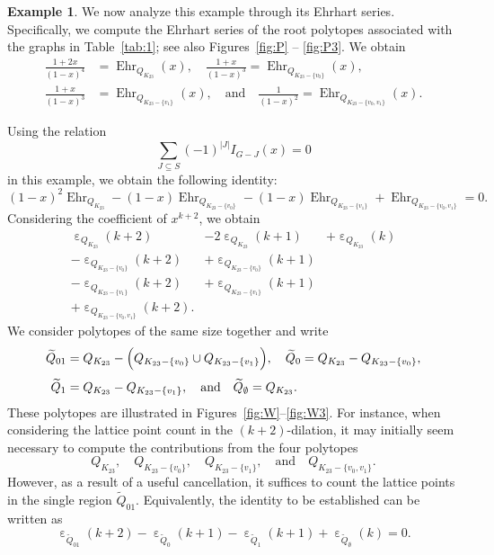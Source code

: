 \documentclass{amsart}
\theoremstyle{definition}
\newtheorem{example}[theorem]{Example}
\theoremstyle{remark}
\DeclareMathOperator{\Ehr}{Ehr}
\DeclareMathOperator{\ehr}{\varepsilon}
\numberwithin{equation}{section}
\begin{document}
\begin{example}
We now analyze this example through its Ehrhart series. Specifically, we compute the Ehrhart series of the root polytopes associated with the graphs in Table~\ref{tab:1}; see also Figures~\ref{fig:P} -- \ref{fig:P3}. We obtain
\[
\begin{split}
\frac{1+2x}{(1-x)^4} &= \Ehr_{Q_{K_{23}}}(x), \quad
\frac{1+x}{(1-x)^3} = \Ehr_{Q_{K_{23}-\{v_0\}}}(x), \\[1mm]
\frac{1+x}{(1-x)^3} &= \Ehr_{Q_{K_{23}-\{v_1\}}}(x), \quad
\text{and} \quad \frac{1}{(1-x)^2} = \Ehr_{Q_{K_{23}-\{v_0,v_1\}}}(x).
\end{split}
\]


Using the relation 
\[
\sum_{J\subseteq S}(-1)^{|J|}I_{G-J}(x)=0
\]
in this example, we obtain the following identity:
\[
(1-x)^2\Ehr_{Q_{K_{23}}}-(1-x)\Ehr_{Q_{K_{23}-\{v_0\}}}-(1-x)\Ehr_{Q_{K_{23}-\{v_1\}}}+\Ehr_{Q_{K_{23}-\{v_0,v_1\}}}=0.
\]
Considering the coefficient of $x^{k+2}$, we obtain
\begin{eqnarray*}
            \ehr_{Q_{K_{23}}}(k+2)&-2\ehr_{Q_{K_{23}}}(k+1) &+\ehr_{Q_{K_{23}}}(k)\\
   -\ehr_{Q_{K_{23}-\{v_0\}}}(k+2)&+\ehr_{Q_{K_{23}-\{v_0\}}}(k+1)& \\
   -\ehr_{Q_{K_{23}-\{v_1\}}}(k+2)&+\ehr_{Q_{K_{23}-\{v_1\}}}(k+1)& \\
+\ehr_{Q_{K_{23}-\{v_0,v_1\}}}(k+2).&
\end{eqnarray*}
We consider polytopes of the same size together and write
\[
\begin{split}
\widetilde{Q}_{01} &= Q_{K_{23}} - \Bigl( Q_{K_{23}-\{v_0\}} \cup Q_{K_{23}-\{v_1\}} \Bigr), \quad
\widetilde{Q}_0 = Q_{K_{23}} - Q_{K_{23}-\{v_0\}},\\[1mm]
\widetilde{Q}_1 &= Q_{K_{23}} - Q_{K_{23}-\{v_1\}}, \quad \text{and} \quad
\widetilde{Q}_\emptyset = Q_{K_{23}}.
\end{split}
\]
These polytopes are illustrated in Figures~\ref{fig:W}--\ref{fig:W3}. For instance, when considering the lattice point count in the $(k+2)$-dilation, it may initially seem necessary to compute the contributions from the four polytopes
\[
Q_{K_{23}},\quad Q_{K_{23}-\{v_0\}},\quad Q_{K_{23}-\{v_1\}},\quad \text{and} \quad Q_{K_{23}-\{v_0,v_1\}}.
\]
However, as a result of a useful cancellation, it suffices to count the lattice points in the single region $\widetilde{Q}_{01}$. Equivalently, the identity to be established can be written as
\[
\ehr_{\widetilde{Q}_{01}}(k+2)-\ehr_{\widetilde{Q}_0}(k+1)-\ehr_{\widetilde{Q}_1}(k+1)+\ehr_{\widetilde{Q}_\emptyset}(k)=0.
\]



\end{example}
\end{document}
